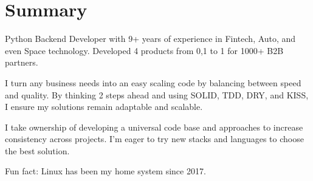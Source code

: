 \section{Summary}
Python Backend Developer with 9+ years of experience in Fintech, Auto, and even Space technology.
\vspace{0.4em}
Developed 4 products from 0,1 to 1 for 1000+ B2B partners.

\vspace{0.4em}
I turn any business needs into an easy scaling code by balancing between speed and quality. By thinking 2 steps ahead and using SOLID, TDD, DRY, and KISS, I ensure my solutions remain adaptable and scalable.

\vspace{0.4em}
I take ownership of developing a universal code base and approaches to increase consistency across projects. I'm eager to try new stacks and languages to choose the best solution.

\vspace{0.4em}
Fun fact: Linux has been my home system since 2017.

